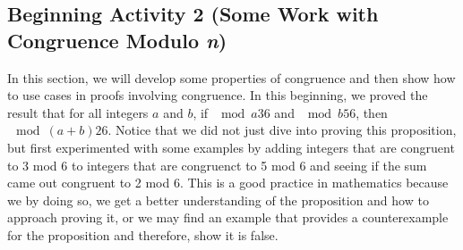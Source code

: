 \documentclass[11pt]{article}
\begin{document}
\subsection*{Beginning Activity 2 (Some Work with Congruence Modulo \emph{n})}
In this section, we will develop some properties of congruence and then show how to use cases in proofs involving congruence.  In this beginning, we proved the result that for all integers $a$ and $b$, if $\mod{a}{3}{6}$ and $\mod{b}{5}{6}$, then $\mod{(a+b)}{2}{6}$.  Notice that we did not just dive into proving this proposition, but first experimented with some examples by adding integers that are congruent to 3 mod 6 to integers that are congruenct to 5 mod 6 and seeing if the sum came out congruent to 2 mod 6.  This is a good practice in mathematics because we by doing so, we get a better understanding of the proposition and how to approach proving it, or we may find an example that provides a counterexample for the proposition and therefore, show it is false.
\end{document}
